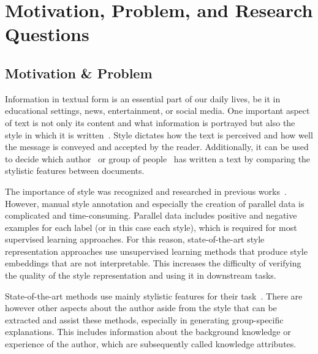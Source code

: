 
\section{Motivation, Problem, and Research Questions}

\subsection{Motivation \& Problem}
Information in textual form is an essential part of our daily lives, be it in educational settings, news, entertainment, or social media. One important aspect of text is not only its content and what information is portrayed but also the style in which it is written~\cite{wegmannSameAuthorJust2022}. Style dictates how the text is perceived and how well the message is conveyed and accepted by the reader. Additionally, it can be used to decide which author~\cite{alshomaryLatentSpaceInterpretation2024} or group of people~\cite{10.1007/978-3-642-29047-3_27} has written a text by comparing the stylistic features between documents.

The importance of style was recognized and researched in previous works~\cite{zhu-etal-2024-styleflow, ijcai2020p526,wegmannSameAuthorJust2022}. However, manual style annotation and especially the creation of parallel data is complicated and time-consuming. Parallel data includes positive and negative examples for each label (or in this case each style), which is required for most supervised learning approaches. For this reason, state-of-the-art style representation approaches use unsupervised learning methods that produce style embeddings that are not interpretable. This increases the difficulty of verifying the quality of the style representation and using it in downstream tasks.

State-of-the-art methods use mainly stylistic features for their task~\cite{alshomaryLatentSpaceInterpretation2024,patelLearningInterpretableStyle2023,konenStyleVectorsSteering2024,zhu-etal-2024-styleflow}. There are however other aspects about the author aside from the style that can be extracted and assist these methods, especially in generating group-specific explanations. This includes information about the background knowledge or experience of the author, which are subsequently called knowledge attributes.

